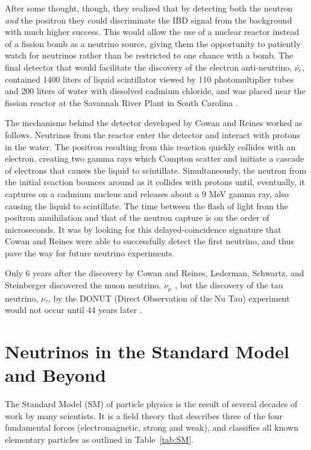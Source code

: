 After some thought, though, they realized that by detecting both the neutron \textit{and} the positron they could discriminate the IBD signal from the background with much higher success. 
This would allow the use of a nuclear reactor instead of a fission bomb as a neutrino source, giving them the opportunity to patiently watch for neutrinos rather than be restricted to one chance with a bomb. 
The final detector that would facilitate the discovery of the electron anti-neutrino, $\bar{\nu_{e}}$, contained 1400 liters of liquid scintillator viewed by 110 photomultiplier tubes and 200 liters of water with dissolved cadmium chloride, and was placed near the fission reactor at the Savannah River Plant in South Carolina \cite{Cowan}. 

The mechanisms behind the detector developed by Cowan and Reines worked as follows. 
Neutrinos from the reactor enter the detector and interact with protons in the water. 
The positron resulting from this reaction quickly collides with an electron, creating two gamma rays which Compton scatter and initiate a cascade of electrons that causes the liquid to scintillate. 
Simultaneously, the neutron from the initial reaction bounces around as it collides with protons until, eventually, it captures on a cadmium nucleus and releases about a 9 MeV gamma ray, also causing the liquid to scintillate. 
The time between the flash of light from the positron annihilation and that of the neutron capture is on the order of microseconds. 
It was by looking for this delayed-coincidence signature that Cowan and Reines were able to successfully detect the first neutrino, and thus pave the way for future neutrino experiments. 

Only 6 years after the discovery by Cowan and Reines, Lederman, Schwartz, and Steinberger discovered the muon neutrino, $\nu_{\mu}$ \cite{Lederman},
but the discovery of the tau neutrino, $\nu_{\tau}$, by the DONUT (Direct Observation of the Nu Tau) experiment would not occur until 44 years later \cite{TauDONUT,DONUT}.


\section{Neutrinos in the Standard Model and Beyond} \label{ch:NeutrinosInSM}

The Standard Model (SM) of particle physics is the result of several decades of work by many scientists. It is a field theory that describes three of the four fundamental forces (electromagnetic, strong and weak), and classifies all known elementary particles as outlined in Table~\ref{tab:SM}.

